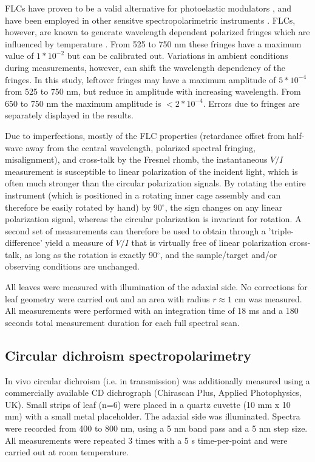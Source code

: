 \documentclass[review]{elsarticle}
\begin{document}
FLCs have proven to be a valid alternative for photoelastic modulators \cite{Gandorfer1999}, and have been employed in other sensitve spectropolarimetric instruments \cite{Bailey2015}. FLCs, however, are known to generate wavelength dependent polarized fringes which are influenced by temperature \cite{JuanOvelar2012}. From 525 to 750 nm these fringes have a maximum value of $1*10^{-2}$ but can be calibrated out. Variations in ambient conditions during measurements, however, can shift the wavelength dependency of the fringes. In this study, leftover fringes may have a maximum amplitude of $5*10^{-4}$ from 525 to 750 nm, but reduce in amplitude with increasing wavelength. From 650 to 750 nm the maximum amplitude is $<2*10^{-4}$. Errors due to fringes are separately displayed in the results.

Due to imperfections, mostly of the FLC properties (retardance offset from half-wave away from the central wavelength, polarized spectral fringing, misalignment), and cross-talk by the Fresnel rhomb, the instantaneous $V/I$ measurement is susceptible to linear polarization of the incident light, which is often much stronger than the circular polarization signals. By rotating the entire instrument (which is positioned in a rotating inner cage assembly and can therefore be easily rotated by hand) by 90$^\circ$, the sign changes on any linear polarization signal, whereas the circular polarization is invariant for rotation. A second set of measurements can therefore be used to obtain through a 'triple-difference' yield a measure of $V/I$ that is virtually free of linear polarization cross-talk, as long as the rotation is exactly 90$^\circ$, and the sample/target and/or observing conditions are unchanged. 

All leaves were measured with illumination of the adaxial side. No corrections for leaf geometry were carried out and an area with radius $r \approx 1$ cm was measured. All measurements were performed with an integration time of 18 ms and a 180 seconds total measurement duration for each full spectral scan.       

\subsection{Circular dichroism spectropolarimetry} 
In vivo circular dichroism (i.e. in transmission) was additionally measured using a commercially available CD dichrograph (Chirascan Plus, Applied Photophysics, UK). Small strips of leaf (n=6) were placed in a quartz cuvette (10 mm x 10 mm) with a small metal placeholder. The adaxial side was illuminated. Spectra were recorded from 400 to 800 nm, using a 5 nm band pass and a 5 nm step size. All measurements were repeated 3 times with a 5 s time-per-point and were carried out at room temperature. 
\end{document}

